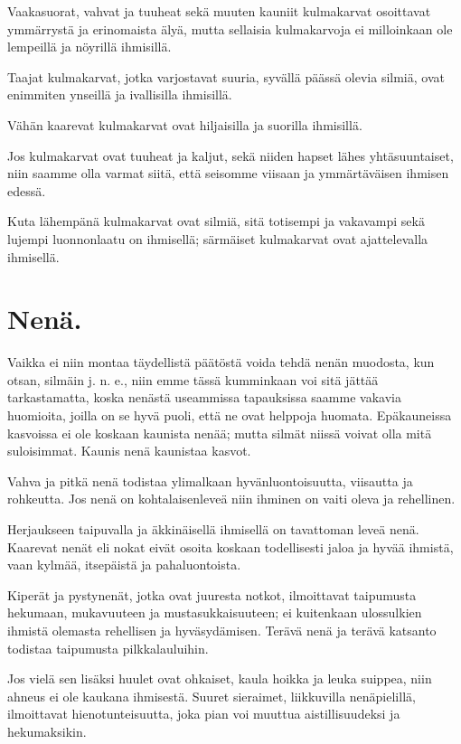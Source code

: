 \documentclass[11pt, twoside, finnish, a5paper]{book}
\begin{document}
Vaakasuorat, vahvat ja tuuheat sekä muuten
kauniit kulmakarvat osoittavat ymmärrystä ja erinomaista älyä,
mutta sellaisia kulmakarvoja ei milloinkaan ole lempeillä
ja nöyrillä ihmisillä.

Taajat kulmakarvat, jotka varjostavat suuria,
syvällä päässä olevia silmiä, ovat enimmiten
ynseillä ja ivallisilla ihmisillä.

Vähän kaarevat kulmakarvat ovat hiljaisilla ja suorilla
ihmisillä.

Jos kulmakarvat ovat tuuheat ja kaljut, sekä niiden
hapset lähes yhtäsuuntaiset, niin saamme olla varmat
siitä, että seisomme viisaan ja ymmärtäväisen ihmisen
edessä.

Kuta lähempänä kulmakarvat ovat silmiä, sitä totisempi
ja vakavampi sekä lujempi luonnonlaatu on ihmisellä;
särmäiset kulmakarvat ovat ajattelevalla ihmisellä.


\chapter*{Nenä.}

Vaikka ei niin montaa täydellistä päätöstä voida tehdä
nenän muodosta, kun otsan, silmäin j. n. e., niin emme
tässä kumminkaan voi sitä jättää tarkastamatta, koska
nenästä useammissa tapauksissa saamme vakavia huomioita,
 joilla on se hyvä puoli, että ne ovat helppoja
huomata. Epäkauneissa kasvoissa ei ole koskaan
kaunista nenää; mutta silmät niissä voivat olla mitä
suloisimmat. Kaunis nenä kaunistaa kasvot.
 
Vahva ja pitkä nenä todistaa ylimalkaan
hyvänluontoisuutta, viisautta ja rohkeutta.
Jos nenä on kohtalaisenleveä niin ihminen on
vaiti oleva ja rehellinen.

Herjaukseen taipuvalla ja äkkinäisellä ihmisellä on
tavattoman leveä nenä. Kaarevat nenät eli nokat
eivät osoita koskaan todellisesti jaloa ja hyvää
ihmistä, vaan kylmää, itsepäistä ja pahaluontoista.

Kiperät ja pystynenät, jotka ovat juuresta notkot,
ilmoittavat taipumusta hekumaan, mukavuuteen ja
mustasukkaisuuteen; ei kuitenkaan ulossulkien ihmistä
olemasta rehellisen ja hyväsydämisen. Terävä nenä
ja terävä katsanto todistaa taipumusta pilkkalauluihin.

Jos vielä sen lisäksi huulet ovat ohkaiset,
kaula hoikka ja leuka suippea, niin ahneus ei ole
kaukana ihmisestä. Suuret sieraimet, liikkuvilla
nenäpielillä, ilmoittavat hienotunteisuutta,
joka pian voi muuttua aistillisuudeksi ja hekumaksikin.
\end{document}
